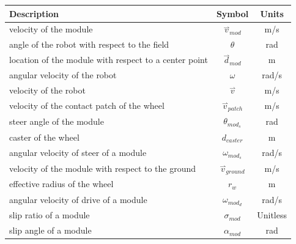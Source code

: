\documentclass{article}
\newcommand{\harpoon}{\overset{\rightharpoonup}}
\begin{document}
\begin{center}
    \begin{tabular}{l c c}
        \toprule
        Description                                                   & Symbol                 & Units                  \\
        \hline
        velocity of the module                                        & $\harpoon{v}_{mod}$    & m/s                    \\
        angle of the robot with respect to the field                  & $\theta$               & rad                    \\
        location of the module with respect to a center point         & $\harpoon{d}_{mod}$    & m                      \\
        angular velocity of the robot                                 & $\omega$               & rad/s                  \\
        velocity of the robot                                         & $\harpoon{v}$          & m/s                    \\
        velocity of the contact patch of the wheel                    & $\harpoon{v}_{patch}$  & m/s                    \\
        steer angle of the module                                     & $\theta_{mod_s}$       & rad                    \\
        caster of the wheel                                           & $d_{caster}$           & m                      \\
        angular velocity of steer of a module                         & $\omega_{mod_s}$       & rad/s                  \\
        velocity of the module with respect to the ground             & $\harpoon{v}_{ground}$ & m/s                    \\
        effective radius of the wheel                                 & $r_w$                  & m                      \\
        angular velocity of drive of a module                         & $\omega_{mod_d}$       & rad/s                  \\
        slip ratio of a module                                        & $\sigma_{mod}$         & Unitless               \\
        slip angle of a module                                        & $\alpha_{mod}$         & rad                    \\

\end{tabular}
\end{center}
\end{document}
